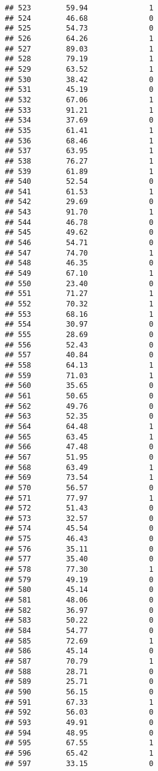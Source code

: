 \documentclass[
]{article}
\begin{document}
\begin{verbatim}
## 523        59.94              1
## 524        46.68              0
## 525        54.73              0
## 526        64.26              1
## 527        89.03              1
## 528        79.19              1
## 529        63.52              1
## 530        38.42              0
## 531        45.19              0
## 532        67.06              1
## 533        91.21              1
## 534        37.69              0
## 535        61.41              1
## 536        68.46              1
## 537        63.95              1
## 538        76.27              1
## 539        61.89              1
## 540        52.54              0
## 541        61.53              1
## 542        29.69              0
## 543        91.70              1
## 544        46.78              0
## 545        49.62              0
## 546        54.71              0
## 547        74.70              1
## 548        46.35              0
## 549        67.10              1
## 550        23.40              0
## 551        71.27              1
## 552        70.32              1
## 553        68.16              1
## 554        30.97              0
## 555        28.69              0
## 556        52.43              0
## 557        40.84              0
## 558        64.13              1
## 559        71.03              1
## 560        35.65              0
## 561        50.65              0
## 562        49.76              0
## 563        52.35              0
## 564        64.48              1
## 565        63.45              1
## 566        47.48              0
## 567        51.95              0
## 568        63.49              1
## 569        73.54              1
## 570        56.57              0
## 571        77.97              1
## 572        51.43              0
## 573        32.57              0
## 574        45.54              0
## 575        46.43              0
## 576        35.11              0
## 577        35.40              0
## 578        77.30              1
## 579        49.19              0
## 580        45.14              0
## 581        48.06              0
## 582        36.97              0
## 583        50.22              0
## 584        54.77              0
## 585        72.69              1
## 586        45.14              0
## 587        70.79              1
## 588        28.71              0
## 589        25.71              0
## 590        56.15              0
## 591        67.33              1
## 592        56.03              0
## 593        49.91              0
## 594        48.95              0
## 595        67.55              1
## 596        65.42              1
## 597        33.15              0

\end{verbatim}
\end{document}
